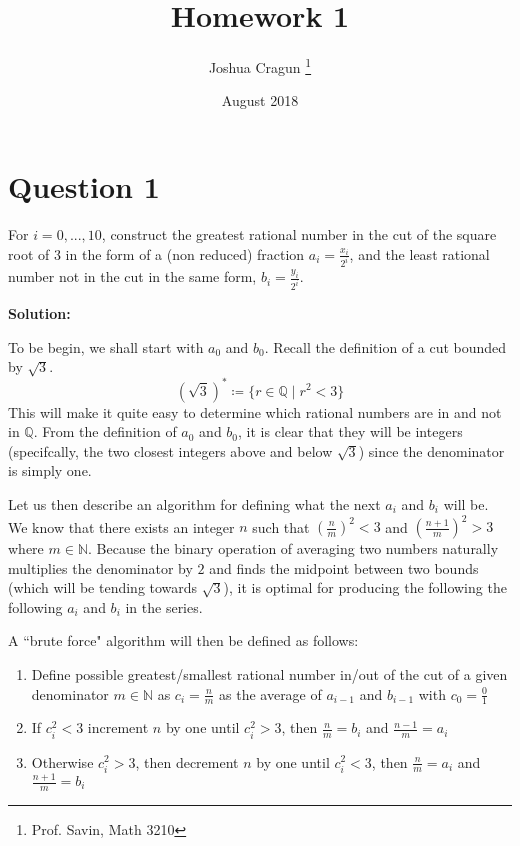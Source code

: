 \documentclass[12pt, letterpaper]{article}
\title{Homework 1}
\author{Joshua Cragun \thanks{Prof. Savin, Math 3210}}
\date{August 2018}
\begin{document}
\begin{titlepage}
\maketitle
\end{titlepage}

\section{Question 1}
For $i = 0, ..., 10$, construct the greatest rational number in the cut of the
square root of $3$ in the form of a (non reduced) fraction $a_i = \frac{x_i}{2^i}$,
and the least rational number not in the cut in the same form, $b_i = \frac{y_i}{2^i}$.

\noindent\textbf{Solution:}

To be begin, we shall start with $a_0$ and $b_0$. Recall the definition of a cut bounded by $\sqrt{3}$.
$$ (\sqrt{3})^{*} \coloneqq \{r \in \mathbb{Q} \mid r^2 < 3 \} $$
This will make it quite easy to determine which rational numbers are in and not
in $\mathbb{Q}$. From the definition of $a_0$ and $b_0$, it is clear that they will
be integers (specifcally, the two closest integers above and below $\sqrt{3}$) since the denominator is simply one.

Let us then describe an algorithm for defining what the next $a_i$ and $b_i$ will be.
We know that there exists an integer $n$ such that $(\frac{n}{m})^2 < 3$ and $(\frac{n + 1}{m})^2 > 3$ where $m \in \mathbb{N}$.
Because the binary operation of averaging two numbers naturally multiplies the denominator by $2$ and finds the midpoint between
two bounds (which will be tending towards $\sqrt{3}$), it is optimal for producing the following the following $a_i$ and $b_i$ in the series.

A ``brute force" algorithm will then be defined as follows:

\begin{enumerate}
  \item Define possible greatest/smallest rational number in/out of the cut of a given denominator $m \in \mathbb{N}$ as $c_i = \frac{n}{m}$ as the average of $a_{i-1}$ and $b_{i-1}$ with $c_0 = \frac{0}{1}$
  \item If $c_i^2 < 3$ increment $n$ by one until $c_i^2 > 3$, then $\frac{n}{m} = b_i$ and $\frac{n - 1}{m} = a_i$
  \item Otherwise $c_i^2 > 3$, then decrement $n$ by one until $c_i^2 < 3$, then $\frac{n}{m} = a_i$ and $\frac{n + 1}{m} = b_i$
\end{enumerate}
\end{document}

